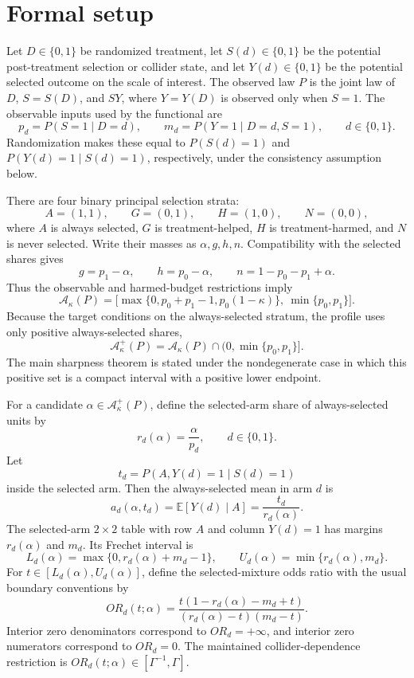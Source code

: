\documentclass[11pt]{article}
\newcommand{\E}{\mathbb{E}}
\theoremstyle{definition}
\theoremstyle{plain}
\theoremstyle{remark}
\begin{document}
\section{Formal setup}
Let \(D\in\{0,1\}\) be randomized treatment, let \(S(d)\in\{0,1\}\) be the
potential post-treatment selection or collider state, and let
\(Y(d)\in\{0,1\}\) be the potential selected outcome on the scale of interest.
The observed law \(P\) is the joint law of \(D\), \(S=S(D)\), and \(SY\), where
\(Y=Y(D)\) is observed only when \(S=1\).  The observable inputs used by the
functional are
\[
  p_d=P(S=1\mid D=d),\qquad
  m_d=P(Y=1\mid D=d,S=1),\qquad d\in\{0,1\}.
\]
Randomization makes these equal to \(P(S(d)=1)\) and
\(P(Y(d)=1\mid S(d)=1)\), respectively, under the consistency assumption below.

There are four binary principal selection strata:
\[
  A=(1,1),\qquad G=(0,1),\qquad H=(1,0),\qquad N=(0,0),
\]
where \(A\) is always selected, \(G\) is treatment-helped, \(H\) is
treatment-harmed, and \(N\) is never selected.  Write their masses as
\(\alpha,g,h,n\).  Compatibility with the selected shares gives
\[
  g=p_1-\alpha,\qquad h=p_0-\alpha,\qquad
  n=1-p_0-p_1+\alpha.
\]
Thus the observable and harmed-budget restrictions imply
\[
  \mathcal A_\kappa(P)
  =
  \bigl[
    \max\{0,p_0+p_1-1,p_0(1-\kappa)\},\ \min\{p_0,p_1\}
  \bigr].
\]
Because the target conditions on the always-selected stratum, the profile uses
only positive always-selected shares,
\[
  \mathcal A_\kappa^+(P)=\mathcal A_\kappa(P)\cap (0,\min\{p_0,p_1\}].
\]
The main sharpness theorem is stated under the nondegenerate case in which this
positive set is a compact interval with a positive lower endpoint.

For a candidate \(\alpha\in\mathcal A_\kappa^+(P)\), define the selected-arm
share of always-selected units by
\[
  r_d(\alpha)=\frac{\alpha}{p_d},\qquad d\in\{0,1\}.
\]
Let
\[
  t_d=P(A,Y(d)=1\mid S(d)=1)
\]
inside the selected arm.  Then the always-selected mean in arm \(d\) is
\[
  a_d(\alpha,t_d)=\E[Y(d)\mid A]=\frac{t_d}{r_d(\alpha)}.
\]
The selected-arm \(2\times2\) table with row \(A\) and column \(Y(d)=1\) has
margins \(r_d(\alpha)\) and \(m_d\).  Its Frechet interval is
\[
  L_d(\alpha)=\max\{0,r_d(\alpha)+m_d-1\},\qquad
  U_d(\alpha)=\min\{r_d(\alpha),m_d\}.
\]
For \(t\in[L_d(\alpha),U_d(\alpha)]\), define the selected-mixture odds ratio
with the usual boundary conventions by
\[
  OR_d(t;\alpha)
  =
  \frac{t(1-r_d(\alpha)-m_d+t)}
       {(r_d(\alpha)-t)(m_d-t)}.
\]
Interior zero denominators correspond to \(OR_d=+\infty\), and interior zero
numerators correspond to \(OR_d=0\).  The maintained collider-dependence
restriction is \(OR_d(t;\alpha)\in[\Gamma^{-1},\Gamma]\).
\end{document}
